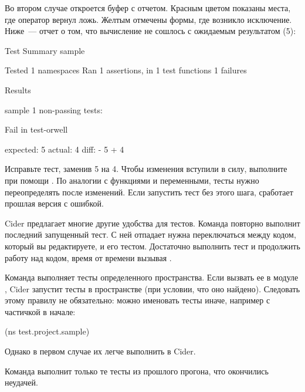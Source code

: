 Во втором случае откроется буфер  с отчетом. Красным цветом показаны места, где оператор  вернул ложь. Желтым отмечены формы, где возникло исключение. Ниже~--- отчет о том, что вычисление  не сошлось с ожидаемым результатом (5):

\begin{english}
  \begin{text}
Test Summary
sample

Tested 1 namespaces
Ran 1 assertions, in 1 test functions
1 failures

Results

sample
1 non-passing tests:

Fail in test-orwell

expected: 5
  actual: 4
    diff: - 5
          + 4
  \end{text}
\end{english}

Исправьте тест, заменив 5 на 4. Чтобы изменения вступили в силу, выполните  при помощи . По аналогии с функциями и переменными, тесты нужно переопределять после изменений. Если запустить тест без этого шага, сработает прошлая версия с ошибкой.

Cider предлагает многие другие удобства для тестов. Команда  повторно выполнит последний запущенный тест. С ней отпадает нужна переключаться между кодом, который вы редактируете, и его тестом. Достаточно выполнить тест и продолжить работу над кодом, время от времени вызывая .

Команда  выполняет тесты определенного пространства. Если вызвать ее в модуле , Cider запустит тесты в пространстве  (при условии, что оно найдено). Следовать этому правилу не обязательно: можно именовать тесты иначе, например с частичкой  в начале:

\begin{english}
  \begin{clojure}
(ns test.project.sample)
  \end{clojure}
\end{english}

Однако в первом случае их легче выполнить в Cider.

Команда  выполнит только те тесты из прошлого прогона, что окончились неудачей.

